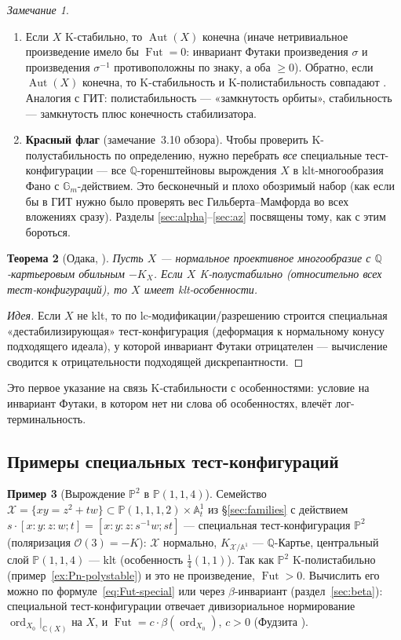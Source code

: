 \documentclass[11pt,a4paper]{article}
\theoremstyle{plain}
\newtheorem{theorem}{Теорема}[section]
\theoremstyle{definition}
\newtheorem{example}[theorem]{Пример}
\theoremstyle{remark}
\newtheorem{remark}[theorem]{Замечание}
\renewcommand{\C}{\mathbb{C}}
\newcommand{\Q}{\mathbb{Q}}
\newcommand{\PP}{\mathbb{P}}
\newcommand{\A}{\mathbb{A}}
\newcommand{\Gm}{\mathbb{G}_m}
\newcommand{\cO}{\mathcal{O}}
\newcommand{\cX}{\mathcal{X}}
\DeclareMathOperator{\ord}{ord}
\DeclareMathOperator{\Aut}{Aut}
\DeclareMathOperator{\Fut}{Fut}
\begin{document}
\begin{remark}\label{rem:BX}
\begin{enumerate}
\item Если $X$ K-стабильно, то $\Aut(X)$ конечна (иначе нетривиальное произведение имело бы
$\Fut=0$: инвариант Футаки произведения $\sigma$ и произведения $\sigma^{-1}$ противоположны по
знаку, а оба $\ge0$). Обратно, если $\Aut(X)$ конечна, то K-стабильность и K-полистабильность
совпадают \cite[BX19]{BX}. Аналогия с ГИТ: полистабильность --- «замкнутость орбиты»,
стабильность --- замкнутость плюс конечность стабилизатора.
\item \textbf{Красный флаг} (замечание~3.10 обзора). Чтобы проверить K-полустабильность по
определению, нужно перебрать \emph{все} специальные тест-конфигурации --- все $\Q$-горенштейновы
вырождения $X$ в klt-многообразия Фано с $\Gm$-действием. Это бесконечный и плохо обозримый набор
(как если бы в ГИТ нужно было проверять вес Гильберта--Мамфорда во всех вложениях сразу). Разделы
\ref{sec:alpha}--\ref{sec:az} посвящены тому, как с этим бороться.
\end{enumerate}
\end{remark}

\begin{theorem}[{Одака, \cite{Oda13}}]\label{thm:Odaka}
Пусть $X$ --- нормальное проективное многообразие с $\Q$-картьеровым обильным $-K_X$. Если $X$
K-полустабильно (относительно всех тест-конфигураций), то $X$ имеет klt-особенности.
\end{theorem}

\begin{proof}[Идея]
Если $X$ не klt, то по lc-модификации/разрешению строится специальная «дестабилизирующая»
тест-конфигурация (деформация к нормальному конусу подходящего идеала), у которой инвариант Футаки
отрицателен --- вычисление сводится к отрицательности подходящей дискрепантности.
\end{proof}

Это первое указание на связь K-стабильности с особенностями: условие на инвариант Футаки,
в котором нет ни слова об особенностях, влечёт лог-терминальность.

\subsection{Примеры специальных тест-конфигураций}

\begin{example}[Вырождение $\PP^2$ в $\PP(1,1,4)$]\label{ex:P2-to-P114}
Семейство $\cX=\{xy=z^2+tw\}\subset\PP(1,1,1,2)\times\A^1_t$ из \S\ref{sec:families} с действием
$s\cdot[x:y:z:w;t]=[x:y:z:s^{-1}w;st]$ --- специальная тест-конфигурация $\PP^2$ (поляризация
$\cO(3)=-K$): $\cX$ нормально, $K_{\cX/\A^1}$ --- $\Q$-Картье, центральный слой
$\PP(1,1,4)$ --- klt (особенность $\frac14(1,1)$). Так как $\PP^2$ K-полистабильно
(пример~\ref{ex:Pn-polystable}) и это не произведение, $\Fut>0$. Вычислить его можно по
формуле~\eqref{eq:Fut-special} или через $\beta$-инвариант (раздел~\ref{sec:beta}): специальной
тест-конфигурации отвечает дивизориальное нормирование $\ord_{X_0}|_{\C(X)}$ на $X$, и
$\Fut=c\cdot\beta(\ord_{X_0})$, $c>0$ (Фудзита \cite{Fuj19b}).
\end{example}
\end{document}
